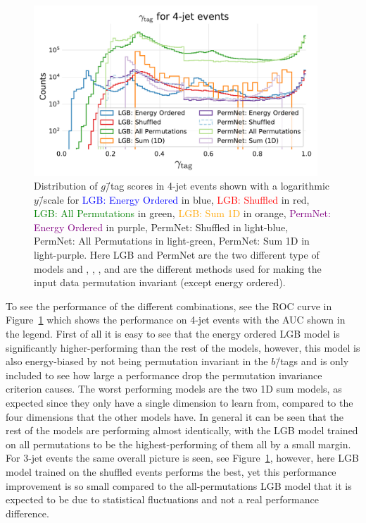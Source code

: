 \begin{figure}[h!]
  \centerfloat
  \includegraphics[width=0.95\textwidth, trim=10 10 10 45, clip]{figures/quarks/gtag_y_pred_4_jet_hist-down_sample=1.00-ML_vars=vertex-selection=b-ejet_min=4-n_iter_RS_lgb=99-n_iter_RS_xgb=9-cdot_cut=0.90-version=19.pdf}
  \caption[$g$\=/Tag Scores in 4-Jet Events]
          {Distribution of $g$\=/tag scores in 4-jet events shown with a logarithmic $y$\=/scale for \textcolor{blue}{LGB: Energy Ordered} in blue, \textcolor{red}{LGB: Shuffled} in red, \textcolor{green}{LGB: All Permutations} in green, \textcolor{orange}{LGB: Sum 1D} in orange, \textcolor{purple}{PermNet: Energy Ordered} in purple, \textcolor{light-blue}{PermNet: Shuffled} in light-blue, \textcolor{light-green}{PermNet: All Permutations} in light-green, \textcolor{light-purple}{PermNet: Sum 1D} in light-purple.  Here LGB and PermNet are the two different type of models and , , , and  are the different methods used for making the input data permutation invariant (except energy ordered).}   
  \label{fig:q:gtag_scores_4j}
\end{figure}

To see the performance of the different combinations, see the ROC curve in Figure~\ref{fig:q:gtag_scores_4j} which shows the performance on 4-jet events with the AUC shown in the legend. First of all it is easy to see that the energy ordered LGB model is significantly higher-performing than the rest of the models, however, this model is also energy-biased by not being permutation invariant in the $b$\=/tags and is only included to see how large a performance drop the permutation invariance criterion causes. The worst performing models are the two 1D sum models, as expected since they only have a single dimension to learn from, compared to the four dimensions that the other models have. In general it can be seen that the rest of the models are performing almost identically, with the LGB model trained on all permutations to be the highest-performing of them all by a small margin. 
For 3-jet events the same overall picture is seen, see Figure~\ref{fig:q:gtag_scores_4j}, however, here LGB model trained on the shuffled events performs the best, yet this performance improvement is so small compared to the all-permutations LGB model that it is expected to be due to statistical fluctuations and not a real performance difference. 

